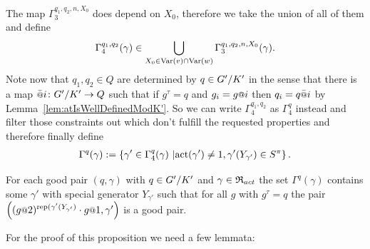 \documentclass[a4paper,11pt]{amsart}
\begin{document}
 The map $\Gamma_3^{q_1,q_2,n,X_0}$ does depend on $X_0$, therefore we take the union of all of them and define
  \[\Gamma_4^{q_1,q_2}(\gamma)\in \bigcup_{X_0\in \textup{Var}(v)\cap\textup{Var}(w)}\Gamma_3^{q_1,q_2,n,X_0}(\gamma).\]
 Note now that $q_{1},q_2\in Q$ are determined by $q\in{G'/K'}$ in the sense that there is a map $\att{i}\colon \RNK{G'}{K'}\to Q$ such that if $g^\tau = q$ and $g_i=g\at{i}$ 
 then $q_i = q\att{i}$  by Lemma~\ref{lem:atIsWellDefinedModK'}. So we can write $\Gamma_4^{q_1,q_2}$ as $\Gamma_4^q$ instead and filter those 
 constraints out which don't fulfill the requested properties and therefore finally define
 \begin{align}
 \Gamma^q(\gamma) := \left\{\gamma' \in \Gamma_4^q(\gamma) \ \middle \vert 
  \operatorname{act}(\gamma')\neq 1, \gamma'({Y_{\gamma'}}) \in S^\pi \right\}. 
  \label{def:Gammaq}
 \end{align}
 \begin{pro}\label{pro:existsNextPair}
 For each good pair $(q,\gamma)$ with $q\in{G'/K'}$ and $\gamma\in\mathfrak{R}_{act}$ the set $\Gamma^q(\gamma)$ 
 contains some $\gamma'$ with special generator $Y_{\gamma'}$ such that for all $g$ with $g^\tau=q$ the
 pair $\left((g\at{2})^{\textup{rep}(\gamma'(Y_{\gamma'})}\cdot g\at{1},\gamma'\right)$ is a good pair.
\end{pro}
For the proof of this proposition we need a few lemmata:
%  
\end{document}
